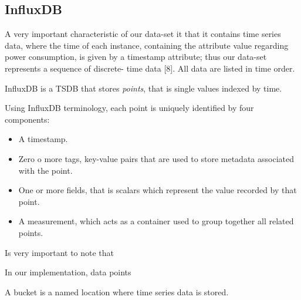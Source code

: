 \documentclass[12pt,a4paper]{report}
\theoremstyle{definition}
\begin{document}
\subsection{InfluxDB}

A very important characteristic of our data-set it that it contains time series data, where the time of each instance, containing the attribute value regarding power consumption, is given by a timestamp attribute; thus our data-set represents a sequence of discrete-
time data [8]. All data are listed in time order.


InfluxDB is a TSDB that stores \textit{points}, that is single values indexed by time. 

Using InfluxDB terminology, each point is uniquely identified by four components:

\begin{itemize}
	\item A timestamp.
	
	\item Zero o more tags, key-value pairs that are used to store metadata associated with the point. 
	 
	\item One or more fields, that is scalars which represent the value recorded by that point.
	
	\item A measurement, which acts as a container used to group together all related points.
	
\end{itemize}

Is very important to note that  

In our implementation, data points 

A bucket is a named location where time series data is stored.







\end{document}
